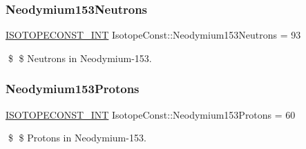 \subsubsection{\texorpdfstring{Neodymium153\+Neutrons}{Neodymium153Neutrons}}
{\footnotesize\ttfamily \mbox{\hyperlink{group___isotope_const-_macros_ga5f18360b3e99483a35c32d789e62621c}{I\+S\+O\+T\+O\+P\+E\+C\+O\+N\+S\+T\+\_\+\+I\+NT}} Isotope\+Const\+::\+Neodymium153\+Neutrons = 93}

\$ \$ Neutrons in Neodymium-\/153. \mbox{\label{group___isotope_const-_neodymium-_nd153_ga01d234b0cec4ac938c5ac12c952b26fb}} 
\subsubsection{\texorpdfstring{Neodymium153\+Protons}{Neodymium153Protons}}
{\footnotesize\ttfamily \mbox{\hyperlink{group___isotope_const-_macros_ga5f18360b3e99483a35c32d789e62621c}{I\+S\+O\+T\+O\+P\+E\+C\+O\+N\+S\+T\+\_\+\+I\+NT}} Isotope\+Const\+::\+Neodymium153\+Protons = 60}

\$ \$ Protons in Neodymium-\/153. 